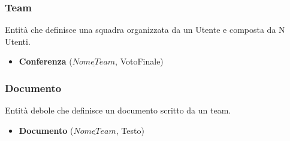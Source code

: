 \documentclass[a4paper, 10pt]{article}
\begin{document}
	\subsubsection{Team}
	Entità che definisce una squadra organizzata da un Utente e composta da N Utenti.
	\begin{itemize}
		\item \textbf{Conferenza} ($\underline{NomeTeam}$, VotoFinale)
	\end{itemize}
	\subsubsection{Documento}
	Entità debole che definisce un documento scritto da un team.
	\begin{itemize}
		\item \textbf{Documento} ($\underline{NomeTeam}$, Testo)
	\end{itemize}
\end{document}
